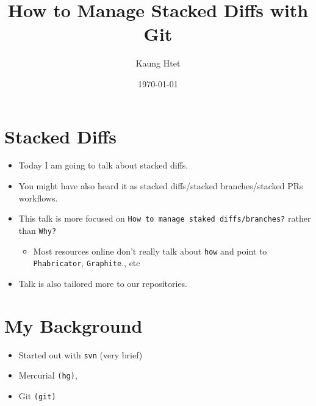 \documentclass[11pt]{article}
\author{Kaung Htet}
\date{\today}
\title{How to Manage Stacked Diffs with Git}
\begin{document}
\maketitle
\tableofcontents

\section{Stacked Diffs}
\label{sec:org6984f5a}
\begin{itemize}
\item Today I am going to talk about stacked diffs.
\item You might have also heard it as stacked diffs/stacked branches/stacked PRs workflows.
\item This talk is more focused on \texttt{How to manage staked diffs/branches?} rather than \texttt{Why?}
\begin{itemize}
\item Most resources online don't really talk about \texttt{how} and point to \texttt{Phabricator}, \texttt{Graphite}., etc
\end{itemize}
\item Talk is also tailored more to our repositories.
\end{itemize}
\section{My Background}
\label{sec:orgeb85d27}
\begin{itemize}
\item Started out with \texttt{svn} (very brief)
\item Mercurial \texttt{(hg)},
\item Git \texttt{(git)}
\end{itemize}
\end{document}
